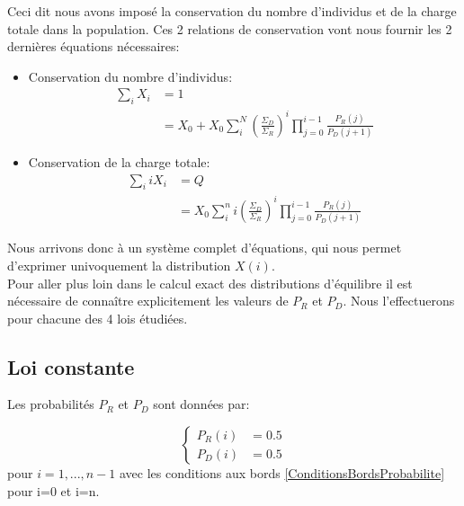 Ceci dit nous avons imposé la conservation du nombre d'individus et de la charge totale dans la population. Ces 2 relations de conservation vont nous fournir les 2 dernières équations nécessaires:
\begin{itemize}
	\item Conservation du nombre d'individus:
		\begin{equation}
		\begin{aligned}
		\sum_i X_i 	&= 1\\
					&= X_0+X_0 \sum_i^{N} (\frac{\Sigma_D}{\Sigma_R})^i \prod_{j=0}^{i-1}\frac{P_R(j)}{P_D(j+1)}
		\end{aligned}
		\end{equation}
		
	\item Conservation de la charge totale:
		\begin{equation}
		\begin{aligned}
		\sum_i i X_i 	&= Q\\
					&= X_0 \sum_i^{n} i (\frac{\Sigma_D}{\Sigma_R})^i \prod_{j=0}^{i-1}\frac{P_R(j)}{P_D(j+1)}
		\end{aligned}
		\end{equation}
\end{itemize}

Nous arrivons donc à un système complet d'équations, qui nous permet d'exprimer univoquement la distribution $X(i)$. \\


Pour aller plus loin dans le calcul exact des distributions d'équilibre il est nécessaire de connaître explicitement les valeurs de $P_R$ et $P_D$. Nous l'effectuerons pour chacune des 4 lois étudiées.

\clearpage


\subsection{Loi constante}
Les probabilités $P_R$ et $P_D$ sont données par:

\begin{equation}
\left \{
\begin{aligned}
P_R(i) &= 0.5\\
P_D(i) &= 0.5
\end{aligned}
\right.
\end{equation}
pour $i=1,...,n-1$ avec les conditions aux bords \ref{ConditionsBordsProbabilite} pour i=0 et i=n.\\

